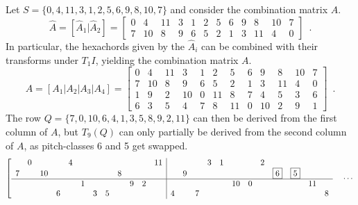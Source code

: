 \begin{example}
	\label{ex:martino-derivation}
	\cite[231]{Martino1961}
	Let $S = \{ 0, 4, 11, 3, 1, 2, 5, 6, 9, 8, 10, 7 \}$ and consider the combination matrix $\hat{A}$.
	\begin{equation}
    	\hat{A} = [\hat{A}_1 | \hat{A}_2] = \left[
    	\begin{array}{cccccc|cccccc}
        	0 & 4 & 11 & 3 & 1 & 2 & 5 & 6 & 9 & 8 & 10 & 7 \\
        	7 & 10 & 8 & 9 & 6 & 5 & 2 & 1 & 3 & 11 & 4 & 0
    	\end{array}
    	\right] \enspace.
	\end{equation}
	In particular, the hexachords given by the $\hat{A}_i$ can be combined with their transforms under $T_1I$, yielding the combination matrix $A$.
	\begin{equation}
    	A = [A_1 | A_2 | A_3 | A_4] = \left[
    	\begin{array}{ccc|ccc|ccc|ccc}
        	0 & 4 & 11 & 3 & 1 & 2 & 5 & 6 & 9 & 8 & 10 & 7 \\
        	7 & 10 & 8 & 9 & 6 & 5 & 2 & 1 & 3 & 11 & 4 & 0 \\
        	\hline
        	1 & 9 & 2 & 10 & 0 & 11 & 8 & 7 & 4 & 5 & 3 & 6 \\
        	6 & 3 & 5 & 4 & 7 & 8 & 11 & 0 & 10 & 2 & 9 & 1
    	\end{array}
    	\right] \enspace.
	\end{equation}
	The row $Q = \{ 7, 0, 10, 6, 4, 1, 3, 5, 8, 9, 2, 11 \}$ can then be derived from the first column of $A$, but $T_9(Q)$ can only partially be derived from the second column of $A$, as pitch-classes 6 and 5 get swapped.
	\begin{equation}
        \left[
        \begin{array}{cccccccccccc|cccccccccccc}
            & 0 &&& 4 &&&&&&& 11 &&&& 3 & 1 &&& 2 &&&& \\
            7 && 10 &&&&&& 8 &&& && 9 &&&&&&& \boxed{6} & \boxed{5} && \\
            \hline
            &&&&& 1 &&&& 9 & 2 & &&&&&& 10 & 0 &&&& 11 & \\
            &&& 6 &&& 3 & 5 &&&& & 4 && 7 &&&&&&&&& 8
        \end{array}
        \right. \quad \cdots
    \end{equation}
\end{example}

